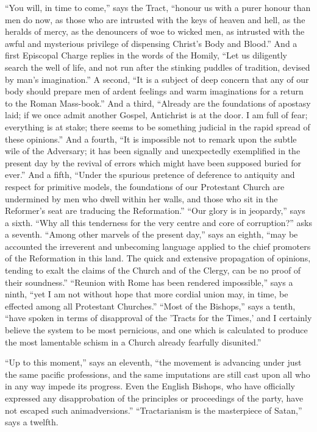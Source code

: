 ``You will, in time to come,'' says the Tract, ``honour
us with a purer honour than men do now, as those who are intrusted
with the keys of heaven and hell, as the heralds of mercy, as the
denouncers of woe to wicked men, as intrusted with the awful and
mysterious privilege of dispensing Christ's Body and Blood.'' And
a first Episcopal Charge replies in the words of the Homily, ``Let
us diligently search the well of life, and not run after the stinking
puddles of tradition, devised by man's imagination.'' A second,
``It is a subject of deep concern that any of our body should
prepare men of ardent feelings and warm imaginations for a return to
the Roman Mass-book.'' And a third, ``Already are the
foundations of apostasy laid; if we once admit another Gospel,
Antichrist is at the door. I am full of fear; everything is at stake;
there seems to be something judicial in the rapid spread of these
opinions.'' And a fourth, ``It is impossible not to remark
upon the subtle wile of the Adversary; it has been signally and
unexpectedly exemplified in the present day by the revival of errors
which might have been supposed buried for ever.'' And a fifth,
``Under the spurious pretence of deference to antiquity and
respect for primitive models, the foundations of our Protestant Church
are undermined by men who dwell within her walls, and those who sit in
the Reformer's seat are traducing the Reformation.'' ``Our
glory is in jeopardy,'' says a sixth. ``Why all this
tenderness for the very centre and core of corruption?'' asks a
seventh. ``Among other marvels of the present day,'' says an
eighth, ``may be accounted the irreverent and unbecoming language
applied to the chief promoters of the Reformation in this land. The
quick and extensive propagation of opinions, tending to exalt the
claims of the Church and of the Clergy, can be no proof of their
soundness.'' ``Reunion with Rome has been rendered
impossible,'' says a ninth, ``yet I am not without hope that
more cordial union may, in time, be effected among all Protestant
Churches.'' ``Most of the Bishops,'' says a tenth,
``have spoken in terms of disapproval of the 'Tracts for the
Times,' and I certainly believe the system to be most pernicious, and
one which is calculated to produce the most lamentable schism in a
Church already fearfully disunited.''

``Up to this moment,'' says an eleventh, ``the movement
is advancing under just the same pacific professions, and the same
imputations are still cast upon all who in any way impede its
progress. Even the English Bishops, who have officially expressed any
disapprobation of the principles or proceedings of the party, have not
escaped such animadversions.'' ``Tractarianism is the
masterpiece of Satan,'' says a twelfth.

